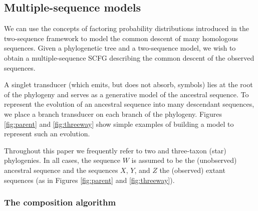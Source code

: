 \documentclass[10pt]{article}
\begin{document}
\subsection*{Multiple-sequence models}

We can use the concepts of factoring probability distributions introduced in the two-sequence
framework to model the common descent of many homologous sequences.
Given a phylogenetic tree and a two-sequence model, we wish to obtain a
multiple-sequence SCFG describing the common descent of the observed sequences.



A singlet transducer (which emits, but does not absorb, symbols) lies at the root of the phylogeny and 
serves as a generative model of the ancestral sequence.
To represent the evolution of an ancestral sequence into many descendant sequences,
we place a branch transducer on each branch of the phylogeny.
Figures \ref{fig:parent} and \ref{fig:threeway} show simple examples
of building a model to represent such an evolution.

Throughout this paper we frequently refer to two and
three-taxon (star) phylogenies.  In all cases, the sequence $W$ is
assumed to be the (unobserved) ancestral sequence and the sequences
$X$, $Y$, and $Z$ the (observed) extant sequences (as in Figures
\ref{fig:parent} and \ref{fig:threeway}).




\subsubsection*{The composition algorithm}
\end{document}
